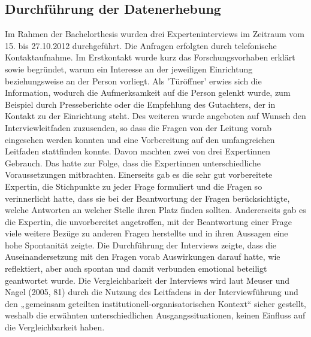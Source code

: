 \subsection{Durchführung der Datenerhebung}
Im Rahmen der Bachelorthesis wurden drei Experteninterviews im Zeitraum vom 15. bis 27.10.2012 durchgeführt. 
Die Anfragen erfolgten durch telefonische Kontaktaufnahme. Im Erstkontakt wurde kurz das Forschungsvorhaben erklärt sowie begründet, warum ein Interesse an der jeweiligen Einrichtung beziehungsweise an der Person vorliegt. Als ’Türöffner’ erwies sich die Information,  wodurch die Aufmerksamkeit auf die Person gelenkt wurde, zum Beispiel durch Presseberichte oder die Empfehlung des Gutachters, der in Kontakt zu der Einrichtung steht. 
Des weiteren wurde angeboten auf Wunsch den Interviewleitfaden zuzusenden, so dass die Fragen von der Leitung vorab eingesehen werden konnten und eine Vorbereitung auf den umfangreichen Leitfaden stattfinden konnte. Davon machten zwei von drei Expertinnen Gebrauch. Das hatte zur Folge, dass die Expertinnen unterschiedliche Voraussetzungen mitbrachten. Einerseits gab es die sehr gut vorbereitete Expertin, die Stichpunkte zu jeder Frage formuliert und die Fragen so verinnerlicht hatte, dass sie bei der Beantwortung der Fragen berücksichtigte, welche Antworten an welcher Stelle ihren Platz finden sollten. Andererseits gab es die Expertin, die unvorbereitet angetroffen, mit der Beantwortung einer Frage viele weitere Bezüge zu anderen Fragen herstellte und in ihren Aussagen eine hohe Spontanität zeigte. Die Durchführung der Interviews zeigte, dass die Auseinandersetzung mit den Fragen vorab Auswirkungen darauf hatte, wie reflektiert, aber auch spontan und damit verbunden emotional beteiligt geantwortet wurde.     
Die Vergleichbarkeit der Interviews wird laut Meuser und Nagel (2005, 81) durch die Nutzung des Leitfadens in der Interviewführung und den „gemeinsam geteilten institutionell-organisatorischen Kontext“ sicher gestellt, weshalb die erwähnten unterschiedlichen Ausgangssituationen, keinen Einfluss auf die Vergleichbarkeit haben.

